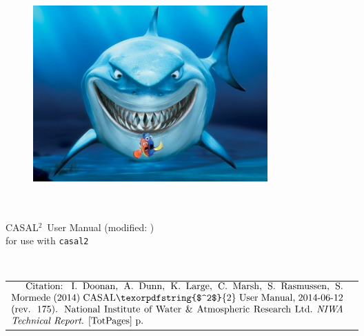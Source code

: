 \documentclass[a4paper,11pt,twoside,pdftex]{article}
\newcommand{\DocYear}{\SourceControlYearDoc}
\newcommand{\DocVer}{\SourceControlDateDoc}
\newcommand{\VER}{\SourceControlShortVersionDoc} %
\newcommand{\CNAME}{CASAL\texorpdfstring{$^2$}{2}} %
\newcommand{\cname}{\texttt{casal2}} %
\newcommand{\authors}{I. Doonan, A. Dunn, K. Large, C. Marsh, S. Rasmussen, S. Mormede}
\newcommand{\Organisation}{National Institute of Water \& Atmospheric Research Ltd.} %
\newcommand{\ManualRef}{\authors\ (\DocYear) \CNAME\ User Manual, \VER. \Organisation\ \emph{NIWA Technical Report}. \ref{TotPages} p.} %
\let\origdoublepage\cleardoublepage
\newcommand{\clearemptydoublepage}{%
  \clearpage
  {\pagestyle{empty}\origdoublepage}%
}
\begin{document}
\vspace{30mm}
\begin{figure}[htp]
  \begin{center}
   \includegraphics[height=7cm,width=9cm]{Figures/nemo}
   \end{center}
\end{figure}


~\vfill
\begin{center}
  \CNAME\ User Manual (modified: \DocVer) \\ for use with \cname\ \VER
\end{center}


\cleardoublepage{}
\fancyfoot[C]{\thepage}
~\vfill

\begin{tabulary}{\textwidth}{L C} 
$\vcenter{Citation: \ManualRef}$      
\end{tabulary}


\clearemptydoublepage{}

\begin{spacing}{0.8} %
\tableofcontents
\end{spacing}


\end{document}

